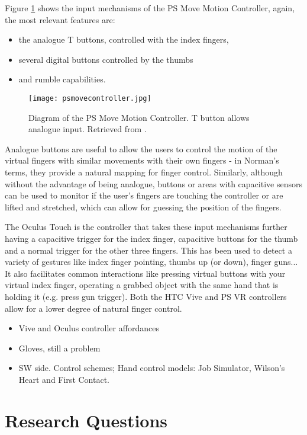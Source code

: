 Figure \ref{fig:psmoveDiagram} shows the input mechanisms of the PS Move Motion Controller, again, the most relevant features are:

\begin{itemize}
\item the analogue T buttons, controlled with the index fingers,
\item several digital buttons controlled by the thumbs
\item and rumble capabilities.
\end{itemize}

\begin{figure}[H]
\centering
\texttt{[image: psmovecontroller.jpg]}
\caption{Diagram of the PS Move Motion Controller. T button allows analogue input. Retrieved from \parencite{psmoveDiagram}.}
\label{fig:psmoveDiagram}
\end{figure}

Analogue buttons are useful to allow the users to control the motion of the virtual fingers with similar movements with their own fingers - in Norman's terms, they provide a natural mapping \parencite{Norman} for finger control. Similarly, although without the advantage of being analogue, buttons or areas with capacitive sensors can be used to monitor if the user's fingers are touching the controller or are lifted and stretched, which can allow for guessing the position of the fingers. 

The Oculus Touch is the controller that takes these input mechanisms further having a capacitive trigger for the index finger, capacitive buttons for the thumb and a normal trigger for the other three fingers. This has been used to detect a variety of gestures like index finger pointing, thumbs up (or down), finger guns... It also facilitates common interactions like pressing virtual buttons with your virtual index finger, operating a grabbed object with the same hand that is holding it (e.g. press gun trigger). Both the HTC Vive and PS VR controllers allow for a lower degree of natural finger control.


\begin{itemize}
\item Vive and Oculus controller affordances
\item Gloves, still a problem
\item SW side. Control schemes; Hand control models: Job Simulator, Wilson's Heart and First Contact.
\end{itemize}

\section{Research Questions}
\label{sec:researchQuestions}

